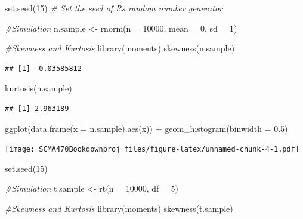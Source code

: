 \documentclass[
]{book}
\newenvironment{Shaded}{\begin{snugshade}}{\end{snugshade}}
\newcommand{\AttributeTok}[1]{\textcolor[rgb]{0.77,0.63,0.00}{#1}}
\newcommand{\CommentTok}[1]{\textcolor[rgb]{0.56,0.35,0.01}{\textit{#1}}}
\newcommand{\DecValTok}[1]{\textcolor[rgb]{0.00,0.00,0.81}{#1}}
\newcommand{\FloatTok}[1]{\textcolor[rgb]{0.00,0.00,0.81}{#1}}
\newcommand{\FunctionTok}[1]{\textcolor[rgb]{0.00,0.00,0.00}{#1}}
\newcommand{\NormalTok}[1]{#1}
\newcommand{\OtherTok}[1]{\textcolor[rgb]{0.56,0.35,0.01}{#1}}
\newcommand{\SpecialCharTok}[1]{\textcolor[rgb]{0.00,0.00,0.00}{#1}}
\theoremstyle{definition}
\theoremstyle{definition}
\theoremstyle{definition}
\theoremstyle{definition}
\theoremstyle{remark}
\begin{document}
\begin{Shaded}
\begin{Highlighting}[]
\FunctionTok{set.seed}\NormalTok{(}\DecValTok{15}\NormalTok{) }\CommentTok{\# Set the seed of R\textquotesingle{}s random number generator}

\CommentTok{\#Simulation}
\NormalTok{n.sample }\OtherTok{\textless{}{-}} \FunctionTok{rnorm}\NormalTok{(}\AttributeTok{n =} \DecValTok{10000}\NormalTok{, }\AttributeTok{mean =} \DecValTok{0}\NormalTok{, }\AttributeTok{sd =} \DecValTok{1}\NormalTok{)}

\CommentTok{\#Skewness and Kurtosis}
\FunctionTok{library}\NormalTok{(moments)}
\FunctionTok{skewness}\NormalTok{(n.sample)}
\end{Highlighting}
\end{Shaded}

\begin{verbatim}
## [1] -0.03585812
\end{verbatim}

\begin{Shaded}
\begin{Highlighting}[]
\FunctionTok{kurtosis}\NormalTok{(n.sample)}
\end{Highlighting}
\end{Shaded}

\begin{verbatim}
## [1] 2.963189
\end{verbatim}

\begin{Shaded}
\begin{Highlighting}[]
\FunctionTok{ggplot}\NormalTok{(}\FunctionTok{data.frame}\NormalTok{(}\AttributeTok{x =}\NormalTok{ n.sample),}\FunctionTok{aes}\NormalTok{(x)) }\SpecialCharTok{+} 
  \FunctionTok{geom\_histogram}\NormalTok{(}\AttributeTok{binwidth =} \FloatTok{0.5}\NormalTok{)}
\end{Highlighting}
\end{Shaded}

\texttt{[image: SCMA470Bookdownproj\_files/figure-latex/unnamed-chunk-4-1.pdf]}

\begin{Shaded}
\begin{Highlighting}[]
\FunctionTok{set.seed}\NormalTok{(}\DecValTok{15}\NormalTok{)}

\CommentTok{\#Simulation}
\NormalTok{t.sample }\OtherTok{\textless{}{-}} \FunctionTok{rt}\NormalTok{(}\AttributeTok{n =} \DecValTok{10000}\NormalTok{, }\AttributeTok{df =} \DecValTok{5}\NormalTok{)}

\CommentTok{\#Skewness and Kurtosis}
\FunctionTok{library}\NormalTok{(moments)}
\FunctionTok{skewness}\NormalTok{(t.sample)}
\end{Highlighting}
\end{Shaded}
\end{document}
